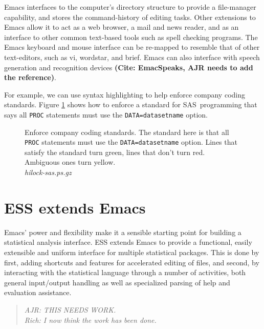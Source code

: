 \documentclass{article}
\newif\ifdraft
\newcommand*{\SAS}{\textsc{SAS}}
\newcommand{\stexttt}[1]{{\small\texttt{#1}}}
\newcommand{\emptyfig}{
\hspace*{42pt}\rule{324pt}{.25pt}\\
\hspace*{42pt}\rule{.25pt}{10pc}
\rule{316pt}{.25pt}
\rule{.25pt}{10pc}}
\newenvironment{Comment}{\begin{quote}\small\itshape }{\end{quote}}
\begin{document}
Emacs interfaces to the computer's directory structure to provide a
file-manager capability, and stores the command-history of editing
tasks.  Other extensions to Emacs allow it to act as a web browser, a
mail and news reader, and as an interface to other common text-based
tools such as spell checking programs.  The Emacs keyboard and mouse
interface can be re-mapped to resemble that of other text-editors,
such as vi, wordstar, and brief.  Emacs can also interface with speech
generation and recognition devices \textbf{(Cite: EmacSpeaks, AJR
  needs to add the reference)}.

For example, we can use syntax highlighting to help enforce company
coding standards.  Figure \ref{f.hilock} shows how to enforce a
standard for \SAS\ programming that says all \stexttt{PROC} statements
must use the \stexttt{DATA=datasetname} option.

\begin{figure}
\ifdraft
  \emptyfig
\else
\fi
\caption[Enforce company coding standards.]{Enforce company coding
standards.  The standard here is that all \stexttt{PROC} statements must use
the \stexttt{DATA=datasetname} option.  Lines that satisfy the standard
turn green, lines that don't turn red.  Ambiguous ones turn yellow.\\
{\it hilock-sas.ps.gz}
\label{f.hilock}}
\end{figure}


\section{ESS extends Emacs}
\label{sec:ess-extends-emacs}

Emacs' power and flexibility make it a sensible starting point for
building a statistical analysis interface.  ESS extends Emacs to
provide a functional, easily extensible and uniform interface for
multiple statistical packages.  This is done by first, adding
shortcuts and features for accelerated editing of files, and second,
by interacting with the statistical language through a number of
activities, both general input/output handling as well as specialized
parsing of help and evaluation assistance.

\begin{Comment}
AJR: THIS NEEDS WORK.\\
Rich: I now think the work has been done.
\end{Comment}

\end{document}
